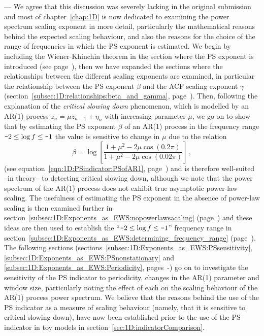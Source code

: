 \begin{enumerate}
	— We agree that this discussion was severely lacking in the original submission and most of chapter~\ref{chap:1D} is now dedicated to examining the power spectrum scaling exponent in more detail, particularly the mathematical reasons behind the expected scaling behaviour, and also the reasons for the choice of the range of frequencies in which the PS exponent is estimated. We begin by including the Wiener-Khinchin theorem in the section where the PS exponent is introduced (see page~\pageref{thm:1D:wiener-khinchin}), then we have expanded the sections where the relationships between the different scaling exponents are examined, in particular the relationship between the PS exponent $\beta$ and the ACF scaling exponent $\gamma$ (section~\ref{subsec:1D:relationships:beta_and_gamma}, page~\pageref{subsec:1D:relationships:beta_and_gamma}). Then, following the explanation of the \emph{critical slowing down} phenomenon, which is modelled by an AR(1) process $z_n = \mu z_{n-1} + \eta_n$ with increasing parameter $\mu$, we go on to show that by estimating the PS exponent $\beta$ of an AR(1) process in the frequency range $\textup{\texttt{-}}2\leq\log f\leq\textup{\texttt{-}}1$ the value is sensitive to change in $\mu$ due to the relation
	\begin{equation*}
	\beta = \log\left[  \frac{1+\mu^2-2\mu \cos(0.2\pi)}{1+\mu^2-2\mu \cos(0.02\pi)}  \right] \,,
	\end{equation*}
	(see equation~\ref{eqn:1D:PSindicator:PSofAR1}, page~\pageref{eqn:1D:PSindicator:PSofAR1}) and is therefore well-suited –in theory– to detecting critical slowing down, although we note that the power spectrum of the AR(1) process does not exhibit true asymptotic power-law scaling. The usefulness of estimating the PS exponent in the absence of power-law scaling is then examined further in section~\ref{subsec:1D:Exponents_as_EWS:nopowerlawsacaling} (page~\pageref{subsec:1D:Exponents_as_EWS:nopowerlawsacaling}) and these ideas are then used to establish the ``$\textup{\texttt{-}}2\leq\log f\leq\textup{\texttt{-}}1$'' frequency range in section~\ref{subsec:1D:Exponents_as_EWS:determining_frequency_range} (page~\pageref{subsec:1D:Exponents_as_EWS:determining_frequency_range}). The following sections (sections~\ref{subsec:1D:Exponents_as_EWS:PSsensitivity}, \ref{subsec:1D:Exponents_as_EWS:PSnonstationary} and \ref{subsec:1D:Exponents_as_EWS:Periodicity}, pages~\pageref{subsec:1D:Exponents_as_EWS:PSsensitivity}-\pageref{sec:1D:numerical_integration}) go on to investigate the sensitivity of the PS indicator to periodicity, changes in the AR(1) parameter and window size, particularly noting the effect of each on the scaling behaviour of the AR(1) process power spectrum. We believe that the reasons behind the use of the PS indicator as a measure of scaling behaviour (namely, that it is sensitive to critical slowing down), have now been established prior to the use of the PS indicator in toy models in section~\ref{sec:1D:indicatorComparison}.

\end{enumerate}
